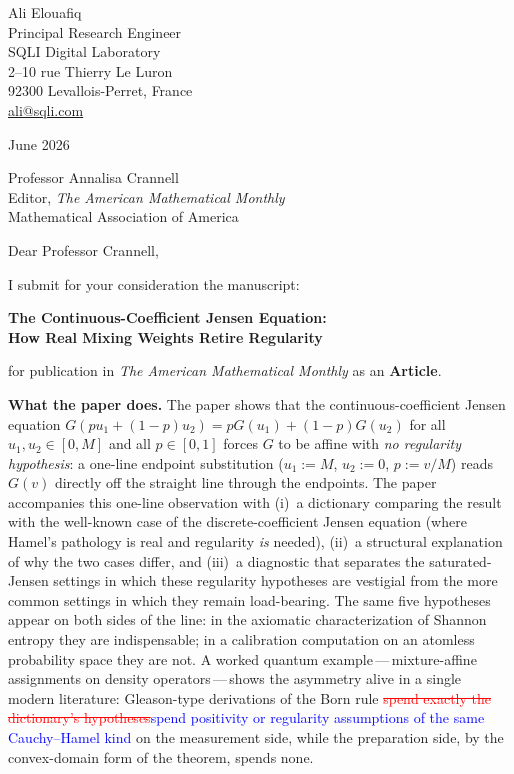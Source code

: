 \documentclass[12pt]{article}
\newcommand{\ReviewAdd}[1]{\textcolor{blue}{#1}}
\newcommand{\ReviewDel}[1]{\textcolor{red}{\sout{#1}}}
\begin{document}
\noindent
Ali Elouafiq\\
Principal Research Engineer\\
SQLI Digital Laboratory\\
2--10 rue Thierry Le Luron\\
92300 Levallois-Perret, France\\
\href{mailto:ali@sqli.com}{ali@sqli.com}

\bigskip
{} June 2026

\bigskip
\noindent
Professor Annalisa Crannell\\
Editor, \textit{The American Mathematical Monthly}\\
Mathematical Association of America

\bigskip
\noindent
Dear Professor Crannell,

\medskip
\noindent
I submit for your consideration the manuscript:

\begin{center}
  \textbf{The Continuous-Coefficient Jensen Equation:}\\
  \textbf{How Real Mixing Weights Retire Regularity}
\end{center}

\noindent
for publication in \textit{The American Mathematical Monthly} as an
\textbf{Article}.

\bigskip
\noindent\textbf{What the paper does.}
The paper shows that the continuous-coefficient Jensen equation
$G(pu_1+(1-p)u_2)=pG(u_1)+(1-p)G(u_2)$ for all $u_1,u_2\in[0,M]$ and
all $p\in[0,1]$ forces $G$ to be affine with \emph{no regularity
hypothesis}: a one-line endpoint substitution ($u_1{:=}M$, $u_2{:=}0$,
$p{:=}v/M$) reads $G(v)$ directly off the straight line through the
endpoints. The paper accompanies this one-line observation with
(i)~a dictionary comparing the result with the well-known case of the
discrete-coefficient Jensen equation (where Hamel's pathology is real
and regularity \emph{is} needed), (ii)~a structural explanation of
why the two cases differ, and (iii)~a diagnostic that separates the
saturated-Jensen settings in which these regularity hypotheses are
vestigial from the more common settings in which they remain
load-bearing. The same five hypotheses appear on both sides of the
line: in the axiomatic characterization of Shannon entropy they are
indispensable; in a calibration computation on an atomless
probability space they are not. A worked quantum
example\,---\,mixture-affine assignments on density
operators\,---\,shows the asymmetry alive in a single modern
literature: Gleason-type derivations of the Born rule \ReviewDel{spend exactly
the dictionary's hypotheses}\ReviewAdd{spend positivity or regularity assumptions of the same Cauchy--Hamel kind} on the measurement side, while the
preparation side, by the convex-domain form of the theorem, spends
none.
\end{document}
